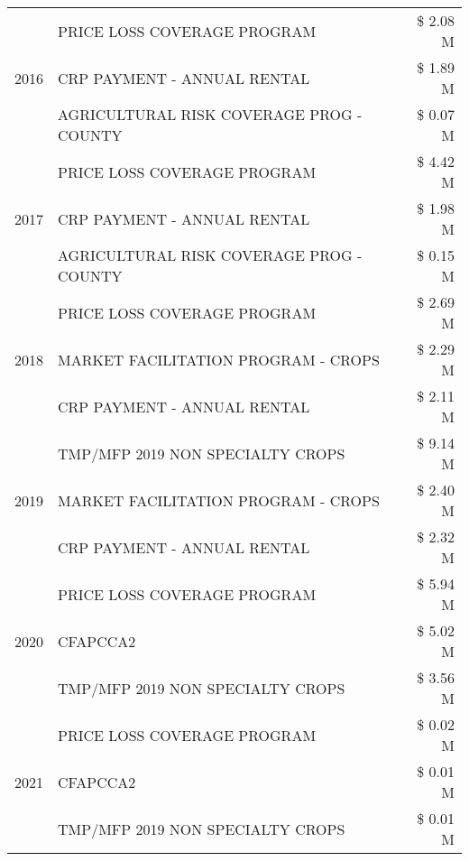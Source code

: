 \begin{tabular}{llr}
\cline{1-3}
\multirow[t]{3}{*}{2016} & PRICE LOSS COVERAGE PROGRAM & \$ 2.08 M \\
 & CRP PAYMENT - ANNUAL RENTAL & \$ 1.89 M \\
 & AGRICULTURAL RISK COVERAGE PROG - COUNTY & \$ 0.07 M \\
\cline{1-3}
\multirow[t]{3}{*}{2017} & PRICE LOSS COVERAGE PROGRAM & \$ 4.42 M \\
 & CRP PAYMENT - ANNUAL RENTAL & \$ 1.98 M \\
 & AGRICULTURAL RISK COVERAGE PROG - COUNTY & \$ 0.15 M \\
\cline{1-3}
\multirow[t]{3}{*}{2018} & PRICE LOSS COVERAGE PROGRAM & \$ 2.69 M \\
 & MARKET FACILITATION PROGRAM - CROPS & \$ 2.29 M \\
 & CRP PAYMENT - ANNUAL RENTAL & \$ 2.11 M \\
\cline{1-3}
\multirow[t]{3}{*}{2019} & TMP/MFP 2019 NON SPECIALTY CROPS & \$ 9.14 M \\
 & MARKET FACILITATION PROGRAM - CROPS & \$ 2.40 M \\
 & CRP PAYMENT - ANNUAL RENTAL & \$ 2.32 M \\
\cline{1-3}
\multirow[t]{3}{*}{2020} & PRICE LOSS COVERAGE PROGRAM & \$ 5.94 M \\
 & CFAPCCA2 & \$ 5.02 M \\
 & TMP/MFP 2019 NON SPECIALTY CROPS & \$ 3.56 M \\
\cline{1-3}
\multirow[t]{3}{*}{2021} & PRICE LOSS COVERAGE PROGRAM & \$ 0.02 M \\
 & CFAPCCA2 & \$ 0.01 M \\
 & TMP/MFP 2019 NON SPECIALTY CROPS & \$ 0.01 M \\
\cline{1-3}
\bottomrule
\end{tabular}

